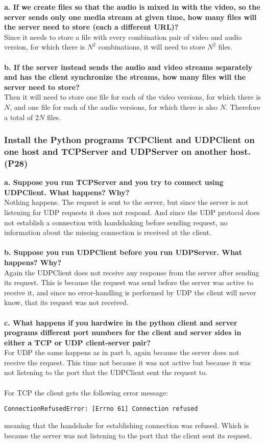 \textbf{a. If we create files so that the audio is mixed in with the video, so the server sends only one media stream at given time, how many files will the server need to store (each a different URL)?} \\
Since it needs to store a file with every combination pair of video and audio version, for which there is $N^2$ combinations, it will need to store $N^2$ files. \\
\\
\textbf{b. If the server instead sends the audio and video streams separately and has the client synchronize the streams, how many files will the server need to store?} \\
Then it will need to store one file for each of the video versions, for which there is $N$, and one file for each of the audio versions, for which there is also $N$. Therefore a total of $2N$ files. \\


\subsubsection{Install the Python programs TCPClient and UDPClient on one host and TCPServer and UDPServer on another host. (P28)}

\textbf{a. Suppose you run TCPServer and you try to connect using UDPClient. What happens? Why?} \\
Nothing happens. The request is sent to the server, but since the server is not listening for UDP requests it does not respond. And since the UDP protocol does not establish a connection with handshaking before sending request, no information about the missing connection is received at the client. \\
\\
\textbf{b. Suppose you run UDPClient before you run UDPServer. What happens? Why?} \\
Again the UDPClient does not receive any response from the server after sending its request. This is because the request was send before the server was active to receive it, and since no error-handling is performed by UDP the client will never know, that its request was not received. \\
\\
\textbf{c. What happens if you hardwire in the python client and server programs different port numbers for the client and server sides in either a TCP or UDP client-server pair?} \\
For UDP the same happens as in part b, again because the server does not receive the request. This time not because it was not active but because it was not listening to the port that the UDPClient sent the request to. \\
\\
For TCP the client gets the following error message:
\begin{verbatim}
ConnectionRefusedError: [Errno 61] Connection refused
\end{verbatim}
meaning that the handshake for establishing connection was refused. Which is because the server was not listening to the port that the client sent its request.

